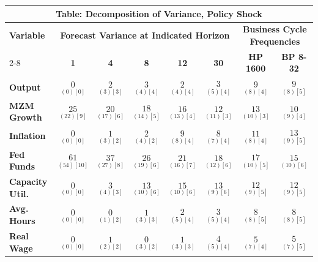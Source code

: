 \documentclass{article}
\begin{document}
 \begin{tabular}{|l|c|@{}c|c|@{}c|c|@{}c|c|} 
 \hline 
 \multicolumn{8}{|c|}{\textbf{Table: Decomposition of Variance, Policy Shock}} \\ \hline 
 \textbf{Variable} & \multicolumn{5}{|c}{\textbf{Forecast Variance at 
 Indicated Horizon}} & \multicolumn{2}{|c|}{\textbf{Business Cycle 
 Frequencies}} \\ \cline{2-8} 
 & \textbf{1} & \textbf{4} & \textbf{8} & \textbf{12} & \textbf{30} & \textbf{%
 HP 1600} & \textbf{BP 8-32} \\ \hline\hline 
 \textbf{Output} & $\underset{(  0) [  0]}{  0}$ & $\underset{(  3) [  3]}{  2}$ & $\underset{(  4) [  4]}{  3}$ & $\underset{(  4) [  4]}{  2}$ & $\underset{(  5) [  4]}{  3}$ & $\underset{(  8) [  4]}{  9}$ & $\underset{(  8) [  5]}{  9}$ \\ \hline 
 \textbf{MZM Growth} & $\underset{( 22) [  9]}{ 25}$ & $\underset{( 17) [  6]}{ 20}$ & $\underset{( 14) [  5]}{ 18}$ & $\underset{( 13) [  4]}{ 16}$ & $\underset{( 11) [  3]}{ 12}$ & $\underset{( 10) [  3]}{ 13}$ & $\underset{(  9) [  4]}{ 10}$ \\ \hline 
 \textbf{Inflation} & $\underset{(  0) [  0]}{  0}$ & $\underset{(  3) [  2]}{  1}$ & $\underset{(  4) [  2]}{  2}$ & $\underset{(  8) [  4]}{  9}$ & $\underset{(  7) [  4]}{  8}$ & $\underset{(  8) [  4]}{ 11}$ & $\underset{(  9) [  5]}{ 13}$ \\ \hline 
 \textbf{Fed Funds} & $\underset{( 54) [ 10]}{ 61}$ & $\underset{( 27) [  8]}{ 37}$ & $\underset{( 19) [  6]}{ 26}$ & $\underset{( 16) [  7]}{ 21}$ & $\underset{( 12) [  6]}{ 18}$ & $\underset{( 10) [  5]}{ 17}$ & $\underset{( 10) [  6]}{ 15}$ \\ \hline 
 \textbf{Capacity Util.} & $\underset{(  0) [  0]}{  0}$ & $\underset{(  4) [  3]}{  3}$ & $\underset{( 10) [  6]}{ 13}$ & $\underset{( 10) [  6]}{ 15}$ & $\underset{(  9) [  6]}{ 13}$ & $\underset{(  9) [  5]}{ 12}$ & $\underset{(  9) [  5]}{ 12}$ \\ \hline 
 \textbf{Avg. Hours} & $\underset{(  0) [  0]}{  0}$ & $\underset{(  1) [  2]}{  0}$ & $\underset{(  3) [  3]}{  1}$ & $\underset{(  5) [  4]}{  2}$ & $\underset{(  5) [  4]}{  3}$ & $\underset{(  8) [  5]}{  8}$ & $\underset{(  8) [  5]}{  8}$ \\ \hline 
 \textbf{Real Wage} &  $\underset{(  0) [  0]}{  0}$ & $\underset{(  2) [  2]}{  1}$ & $\underset{(  3) [  2]}{  0}$ & $\underset{(  3) [  3]}{  1}$ & $\underset{(  5) [  4]}{  4}$ & $\underset{(  7) [  4]}{  5}$ & $\underset{(  7) [  5]}{  5}$ \\ \hline 

\end{tabular}
\end{document}

